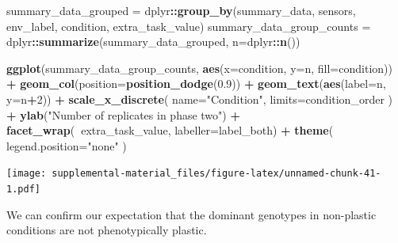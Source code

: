 \documentclass[]{book}
\newenvironment{Shaded}{\begin{snugshade}}{\end{snugshade}}
\newcommand{\DataTypeTok}[1]{\textcolor[rgb]{0.13,0.29,0.53}{#1}}
\newcommand{\DecValTok}[1]{\textcolor[rgb]{0.00,0.00,0.81}{#1}}
\newcommand{\FloatTok}[1]{\textcolor[rgb]{0.00,0.00,0.81}{#1}}
\newcommand{\KeywordTok}[1]{\textcolor[rgb]{0.13,0.29,0.53}{\textbf{#1}}}
\newcommand{\NormalTok}[1]{#1}
\newcommand{\OperatorTok}[1]{\textcolor[rgb]{0.81,0.36,0.00}{\textbf{#1}}}
\newcommand{\StringTok}[1]{\textcolor[rgb]{0.31,0.60,0.02}{#1}}
\begin{document}
\begin{Shaded}
\begin{Highlighting}[]
\NormalTok{summary_data_grouped =}\StringTok{ }\NormalTok{dplyr}\OperatorTok{::}\KeywordTok{group_by}\NormalTok{(summary_data, sensors, env_label, condition, extra_task_value)}
\NormalTok{summary_data_group_counts =}\StringTok{ }\NormalTok{dplyr}\OperatorTok{::}\KeywordTok{summarize}\NormalTok{(summary_data_grouped, }\DataTypeTok{n=}\NormalTok{dplyr}\OperatorTok{::}\KeywordTok{n}\NormalTok{())}

\KeywordTok{ggplot}\NormalTok{(summary_data_group_counts, }\KeywordTok{aes}\NormalTok{(}\DataTypeTok{x=}\NormalTok{condition, }\DataTypeTok{y=}\NormalTok{n, }\DataTypeTok{fill=}\NormalTok{condition)) }\OperatorTok{+}
\StringTok{  }\KeywordTok{geom_col}\NormalTok{(}\DataTypeTok{position=}\KeywordTok{position_dodge}\NormalTok{(}\FloatTok{0.9}\NormalTok{)) }\OperatorTok{+}
\StringTok{  }\KeywordTok{geom_text}\NormalTok{(}\KeywordTok{aes}\NormalTok{(}\DataTypeTok{label=}\NormalTok{n, }\DataTypeTok{y=}\NormalTok{n}\OperatorTok{+}\DecValTok{2}\NormalTok{)) }\OperatorTok{+}
\StringTok{  }\KeywordTok{scale_x_discrete}\NormalTok{(}
    \DataTypeTok{name=}\StringTok{"Condition"}\NormalTok{,}
    \DataTypeTok{limits=}\NormalTok{condition_order}
\NormalTok{  ) }\OperatorTok{+}
\StringTok{  }\KeywordTok{ylab}\NormalTok{(}\StringTok{"Number of replicates in phase two"}\NormalTok{) }\OperatorTok{+}
\StringTok{  }\KeywordTok{facet_wrap}\NormalTok{(}\OperatorTok{~}\NormalTok{extra_task_value, }\DataTypeTok{labeller=}\NormalTok{label_both) }\OperatorTok{+}
\StringTok{  }\KeywordTok{theme}\NormalTok{(}
    \DataTypeTok{legend.position=}\StringTok{"none"}
\NormalTok{  )}
\end{Highlighting}
\end{Shaded}

\texttt{[image: supplemental-material\_files/figure-latex/unnamed-chunk-41-1.pdf]}

We can confirm our expectation that the dominant genotypes in non-plastic conditions are not phenotypically plastic.
\end{document}
